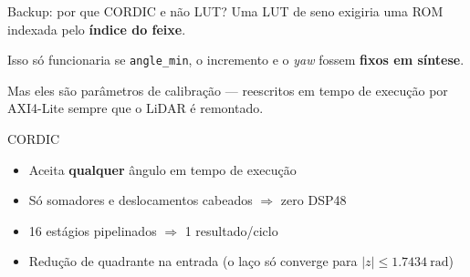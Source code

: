 \documentclass[aspectratio=169, 11pt]{beamer}
\begin{document}
\begin{frame}{Backup: por que CORDIC e não LUT?}
\footnotesize
Uma LUT de seno exigiria uma ROM indexada pelo \textbf{índice do feixe}.

\vspace{2mm}
Isso só funcionaria se \texttt{angle\_min}, o incremento e o \emph{yaw} fossem
\textbf{fixos em síntese}.

\vspace{2mm}
Mas eles são \alert{parâmetros de calibração} --- reescritos em tempo de execução
por AXI4-Lite sempre que o LiDAR é remontado.

\vspace{4mm}
\begin{block}{CORDIC}
\footnotesize
\begin{itemize}
\item Aceita \textbf{qualquer} ângulo em tempo de execução
\item Só somadores e deslocamentos cabeados $\Rightarrow$ \alert{zero DSP48}
\item 16 estágios pipelinados $\Rightarrow$ 1 resultado/ciclo
\item Redução de quadrante na entrada (o laço só converge para
      $|z| \le \SI{1.7434}{\radian}$)
\end{itemize}
\end{block}
\end{frame}
\end{document}
